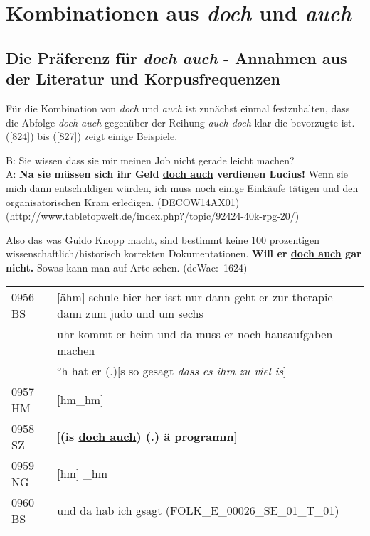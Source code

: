 \chapter{Kombinationen aus \textit{doch} und \textit{auch}}
\label{chapter:dua} 
\section{Die Präferenz für \textit{doch auch} - Annahmen aus der Literatur und Korpusfrequenzen}
\label{sec:präferenz}
Für die Kombination von \textit{doch} und \textit{auch} ist zunächst einmal festzuhalten, dass die Abfolge \textit{doch auch} gegenüber der Reihung \textit{auch doch} klar die bevorzugte ist. (\ref{824}) bis (\ref{827}) zeigt einige Beispiele.

\begin{exe}
	\ex\label{824} 
	\scriptsize
	B: \glqq Sie wissen dass sie mir meinen Job nicht gerade leicht machen?\grqq{}\\
	A: \glqq \textbf{Na sie müssen sich ihr Geld \underline{doch auch} verdienen Lucius!} Wenn sie mich dann entschuldigen würden, 	ich muss noch einige Einkäufe tätigen und den organisatorischen Kram erledigen.\grqq{}
	\newline
	\hbox{}\hfill\hbox{(DECOW14AX01)}
	\newline
	\hbox{}\hfill\hbox{(http://www.tabletopwelt.de/index.php?/topic/92424-40k-rpg-20/)}
\end{exe}

\begin{exe}
	\ex\label{825} 
	\scriptsize
	Also das was Guido Knopp macht, sind bestimmt keine 100 prozentigen wissenschaftlich/historisch korrekten Dokumentationen. \textbf{Will er \underline{doch auch} gar nicht.} Sowas kann man auf Arte sehen. 
	\newline
	\hbox{}\hfill\hbox{(deWac: 1624)}
\end{exe}
	
\begin{exe}
	\ex\label{826} 
	\scriptsize
    \begin{tabular}[t]{ll}
	0956 BS	& $[$ähm$]$ schule hier her isst nur dann geht er zur therapie dann zum judo und um sechs\\
	{} & uhr kommt er heim und da muss er noch hausaufgaben machen\\
	{} & $^{o}$h hat er (.)$[$s so gesagt \emph{dass es ihm zu viel is}$]$\\
	0957 HM & $[$hm\_hm$]$\\
	0958 SZ & \hspace{1cm}\textbf{$[$(is \underline{doch auch}) (.) ä programm$]$}\\
	0959 NG & $[$hm$]$ \_hm\\
	0960 BS & und da hab ich gsagt	
	\hfill\hbox{(FOLK\_E\_00026\_SE\_01\_T\_01)} 					 
    \end{tabular}   
\end{exe}

